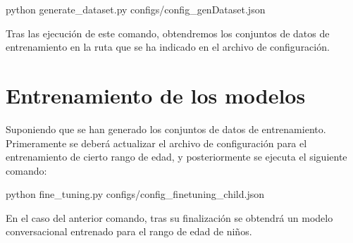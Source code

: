 \begin{center}
    python generate\_dataset.py configs/config\_genDataset.json
\end{center}

Tras las ejecución de este comando, obtendremos los conjuntos de datos de entrenamiento en la ruta que se ha indicado en el archivo de configuración.


\section{Entrenamiento de los modelos}

Suponiendo que se han generado los conjuntos de datos de entrenamiento. Primeramente se deberá actualizar el archivo de configuración para el entrenamiento de cierto rango de edad, y posteriormente se ejecuta el siguiente comando:

\begin{center}
    python fine\_tuning.py configs/config\_finetuning\_child.json
\end{center}

En el caso del anterior comando, tras su finalización se obtendrá un modelo conversacional entrenado para el rango de edad de niños.

